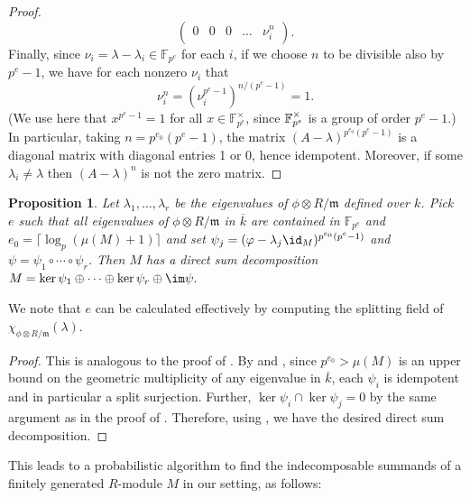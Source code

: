 \documentclass[12pt]{amsart}
\let\bar\overline
\def\FF{\mathbb F}
\def\m{\mathfrak m}
\theoremstyle{theorem}
\numberwithin{thm}{section}
\newtheorem{prop}[thm]{Proposition}
\theoremstyle{definition}
\begin{document}
\begin{proof}
\[\begin{pmatrix}
    0 & 0 & 0 & \dots & \nu_i^n
  \end{pmatrix}. \]
  Finally, since $\nu_i =\lambda-\lambda_i \in \FF_{p^e}$ for each $i$, if we choose $n$ to be divisible also by $p^e-1$, we have for each nonzero $\nu_i$ that $$\nu_i^{n} = (\nu_i^{p^{e}-1})^{n/(p^{e}-1)} =1.$$
(We use here that $x^{p^e-1}=1$ for all $x\in \FF_{p^e}^\times$, since $\mathbb F_{p^e}^\times$ is a group of order $p^e-1$.)
  In particular, taking $n=p^{e_0}(p^e-1)$, the matrix $(A-\lambda)^{p^{e_0}(p^e-1)}$ is a diagonal matrix with diagonal entries 1 or 0, hence idempotent. Moreover, if some $\lambda_i\neq \lambda$ then $(A-\lambda)^n$ is not the zero matrix.
\end{proof}

\begin{prop}\label{prop:split-idems}
  Let $\lambda_1,\dots,\lambda_r$ be the eigenvalues of $\phi\otimes R/\m$ defined over $k$. Pick $e$ such that all eigenvalues of $\phi \otimes R/\m$ in $\bar k$ are contained in $\FF_{p^e}$ and $e_0 =  \lceil \log_p(\mu(M) + 1)\rceil$ and set $\psi_j = (\phi - \lambda_j \id_M)^{p^{e_0} (p^{e} - 1)}$
and $\psi = \psi_1\circ\cdots\circ\psi_r$. Then $M$ has a direct sum decomposition
  \( M = \ker\psi_1 \oplus \cdots \oplus \ker\psi_r \oplus \im\psi. \)
\end{prop}

We note that $e$ can be calculated effectively by computing the splitting field of $\chi_{\phi\otimes R/\m}(\lambda)$.

\begin{proof}
  This is analogous to the proof of . By  and ,
since $p^{e_0}> \mu(M)$ is an upper bound on the geometric multiplicity of any eigenvalue in $\bar k$,
 each $\psi_i$ is idempotent and in particular a split surjection. Further, $\ker\psi_i\cap\ker\psi_j = 0$ by the same argument as in the proof of . Therefore, using , we have the desired direct sum decomposition.
\end{proof}

\pagebreak

This leads to a probabilistic algorithm to find the indecomposable summands of a finitely generated $R$-module $M$ in our setting, as follows:
\end{document}
